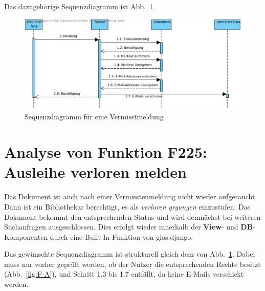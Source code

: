 Das dazugehörige Sequenzdiagramm ist Abb.\ \ref{fig:224}.
\begin{figure}
\begin{center}
\includegraphics[width=0.8\linewidth]{bilder/Seq-Vermisst.pdf}
\caption{Sequenzdiagramm für eine Vermisstmeldung}
\label{fig:224}
\end{center}
\end{figure}

\section{Analyse von Funktion F225: Ausleihe verloren melden}
\label{f:225}
Das Dokument ist auch nach einer Vermisstenmeldung nicht wieder aufgetaucht. 
Dann ist ein Bibliothekar berechtigt, es als \emph{verloren gegangen} 
einzustufen. Das Dokument bekommt den entsprechenden Status und wird demnächst 
bei weiteren Suchanfragen ausgeschlossen. Dies erfolgt wieder innerhalb der 
\textbf{View}- und \textbf{DB}-Komponenten durch eine Built-In-Funktion von 
\gls{glos:django}.

Das gewünschte Sequenzdiagramm ist strukturell gleich dem von Abb.\ 
\ref{fig:224}. Dabei muss nur vorher geprüft werden, ob der Nutzer die 
entsprechenden Rechte besitzt (Abb.\ \ref{fig:F-A}), und Schritt 1.3 bis 1.7 
entfällt, da keine E-Mails verschickt werden.
